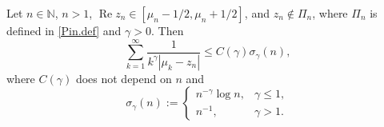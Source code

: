 \begin{lemma}\label{lem.sum.est.2}
Let $n \in {\mathbb{N}}$, $n>1$, $ {\operatorname{Re}} z_n \in [\mu_n-1/2,\mu_n+1/2]$, and $z_n \notin \Pi_n$, where $\Pi_n$ is defined in \eqref{Pin.def} and $\gamma >0$. Then
\begin{equation*}
\sum_{k =1}^{\infty} \frac{1}{k^{\gamma}|\mu_k-z_n| } 
\leq
C(\gamma)
\sigma_{\gamma}(n),
\end{equation*}
where $C(\gamma)$ does not depend on $n$ and
\begin{equation*}
\sigma_{\gamma}(n):=
\begin{cases}
n^{-\gamma} \log n, & \gamma \leq 1, 
\\
n^{-1},  & \gamma > 1.
\end{cases}
\end{equation*}

\end{lemma}
